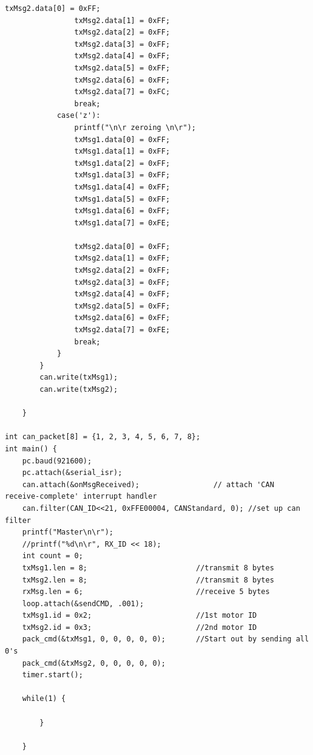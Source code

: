\begin{lstlisting}[language=Arduino, caption= main.cpp, basicstyle=\scriptsize]
                txMsg2.data[0] = 0xFF;
                txMsg2.data[1] = 0xFF;
                txMsg2.data[2] = 0xFF;
                txMsg2.data[3] = 0xFF;
                txMsg2.data[4] = 0xFF;
                txMsg2.data[5] = 0xFF;
                txMsg2.data[6] = 0xFF;
                txMsg2.data[7] = 0xFC;
                break;
            case('z'):
                printf("\n\r zeroing \n\r");
                txMsg1.data[0] = 0xFF;
                txMsg1.data[1] = 0xFF;
                txMsg1.data[2] = 0xFF;
                txMsg1.data[3] = 0xFF;
                txMsg1.data[4] = 0xFF;
                txMsg1.data[5] = 0xFF;
                txMsg1.data[6] = 0xFF;
                txMsg1.data[7] = 0xFE;
                
                txMsg2.data[0] = 0xFF;
                txMsg2.data[1] = 0xFF;
                txMsg2.data[2] = 0xFF;
                txMsg2.data[3] = 0xFF;
                txMsg2.data[4] = 0xFF;
                txMsg2.data[5] = 0xFF;
                txMsg2.data[6] = 0xFF;
                txMsg2.data[7] = 0xFE;
                break;
            }
        }
        can.write(txMsg1);
        can.write(txMsg2);
        
    }
    
int can_packet[8] = {1, 2, 3, 4, 5, 6, 7, 8};
int main() {
    pc.baud(921600);
    pc.attach(&serial_isr);
    can.attach(&onMsgReceived);                 // attach 'CAN receive-complete' interrupt handler
    can.filter(CAN_ID<<21, 0xFFE00004, CANStandard, 0); //set up can filter
    printf("Master\n\r");
    //printf("%d\n\r", RX_ID << 18);
    int count = 0;
    txMsg1.len = 8;                         //transmit 8 bytes
    txMsg2.len = 8;                         //transmit 8 bytes
    rxMsg.len = 6;                          //receive 5 bytes
    loop.attach(&sendCMD, .001);
    txMsg1.id = 0x2;                        //1st motor ID
    txMsg2.id = 0x3;                        //2nd motor ID
    pack_cmd(&txMsg1, 0, 0, 0, 0, 0);       //Start out by sending all 0's
    pack_cmd(&txMsg2, 0, 0, 0, 0, 0);
    timer.start();
    
    while(1) {

        }
        
    }
\end{lstlisting}

